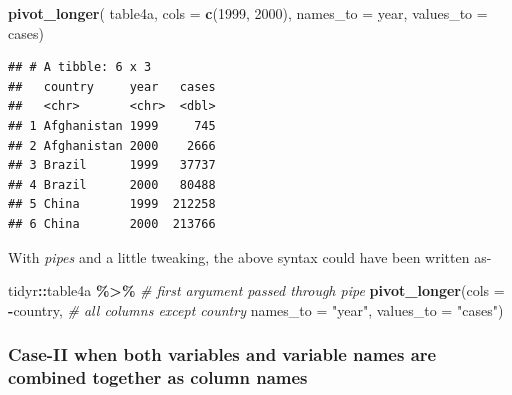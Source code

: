 \documentclass[
]{book}
\newenvironment{Shaded}{\begin{snugshade}}{\end{snugshade}}
\newcommand{\AttributeTok}[1]{\textcolor[rgb]{0.13,0.29,0.53}{#1}}
\newcommand{\CommentTok}[1]{\textcolor[rgb]{0.56,0.35,0.01}{\textit{#1}}}
\newcommand{\FunctionTok}[1]{\textcolor[rgb]{0.13,0.29,0.53}{\textbf{#1}}}
\newcommand{\NormalTok}[1]{#1}
\newcommand{\SpecialCharTok}[1]{\textcolor[rgb]{0.81,0.36,0.00}{\textbf{#1}}}
\newcommand{\StringTok}[1]{\textcolor[rgb]{0.31,0.60,0.02}{#1}}
\begin{document}
\begin{Shaded}
\begin{Highlighting}[]
\FunctionTok{pivot\_longer}\NormalTok{(}
\NormalTok{  table4a, }
  \AttributeTok{cols =} \FunctionTok{c}\NormalTok{(}\StringTok{\textquotesingle{}1999\textquotesingle{}}\NormalTok{, }\StringTok{\textquotesingle{}2000\textquotesingle{}}\NormalTok{), }
  \AttributeTok{names\_to =} \StringTok{\textquotesingle{}year\textquotesingle{}}\NormalTok{, }
  \AttributeTok{values\_to =} \StringTok{\textquotesingle{}cases\textquotesingle{}}\NormalTok{)}
\end{Highlighting}
\end{Shaded}

\begin{verbatim}
## # A tibble: 6 x 3
##   country     year   cases
##   <chr>       <chr>  <dbl>
## 1 Afghanistan 1999     745
## 2 Afghanistan 2000    2666
## 3 Brazil      1999   37737
## 4 Brazil      2000   80488
## 5 China       1999  212258
## 6 China       2000  213766
\end{verbatim}

With \emph{pipes} and a little tweaking, the above syntax could have been written as-

\begin{Shaded}
\begin{Highlighting}[]
\NormalTok{tidyr}\SpecialCharTok{::}\NormalTok{table4a }\SpecialCharTok{\%\textgreater{}\%}                         \CommentTok{\# first argument passed through pipe }
  \FunctionTok{pivot\_longer}\NormalTok{(}\AttributeTok{cols =} \SpecialCharTok{{-}}\NormalTok{country,     }\CommentTok{\# all columns except country}
               \AttributeTok{names\_to =} \StringTok{"year"}\NormalTok{,}
               \AttributeTok{values\_to =} \StringTok{"cases"}\NormalTok{)}
\end{Highlighting}
\end{Shaded}

\hypertarget{case-ii-when-both-variables-and-variable-names-are-combined-together-as-column-names}{%
\subsubsection*{Case-II when both variables and variable names are combined together as column names}\label{case-ii-when-both-variables-and-variable-names-are-combined-together-as-column-names}}
\end{document}
